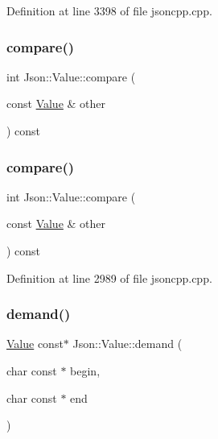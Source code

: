 Definition at line 3398 of file jsoncpp.\+cpp.

\hypertarget{class_json_1_1_value_aefa4464ca1bb0bcc9a87b38ed62ca2e0}{}\label{class_json_1_1_value_aefa4464ca1bb0bcc9a87b38ed62ca2e0} 
\subsubsection{\texorpdfstring{compare()}{compare()}\hspace{0.1cm}{\footnotesize\ttfamily [1/2]}}
{\footnotesize\ttfamily int Json\+::\+Value\+::compare (\begin{DoxyParamCaption}\item[{const \hyperlink{class_json_1_1_value}{Value} \&}]{other }\end{DoxyParamCaption}) const}

\hypertarget{class_json_1_1_value_aefa4464ca1bb0bcc9a87b38ed62ca2e0}{}\label{class_json_1_1_value_aefa4464ca1bb0bcc9a87b38ed62ca2e0} 
\subsubsection{\texorpdfstring{compare()}{compare()}\hspace{0.1cm}{\footnotesize\ttfamily [2/2]}}
{\footnotesize\ttfamily int Json\+::\+Value\+::compare (\begin{DoxyParamCaption}\item[{const \hyperlink{class_json_1_1_value}{Value} \&}]{other }\end{DoxyParamCaption}) const}



Definition at line 2989 of file jsoncpp.\+cpp.

\hypertarget{class_json_1_1_value_afeb7ff596a0929d90c5f2f3cffb413ed}{}\label{class_json_1_1_value_afeb7ff596a0929d90c5f2f3cffb413ed} 
\subsubsection{\texorpdfstring{demand()}{demand()}\hspace{0.1cm}{\footnotesize\ttfamily [1/2]}}
{\footnotesize\ttfamily \hyperlink{class_json_1_1_value}{Value} const$\ast$ Json\+::\+Value\+::demand (\begin{DoxyParamCaption}\item[{char const $\ast$}]{begin,  }\item[{char const $\ast$}]{end }\end{DoxyParamCaption})}

